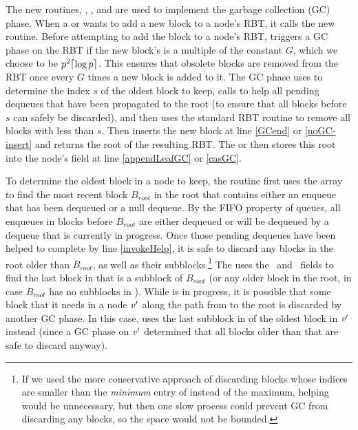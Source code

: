 The new routines, , ,  and  are
used to implement the garbage collection (GC) phase.
When a  or  wants to add a new block to a node's  RBT,
it calls the new  routine.
Before attempting to add the block to a node's RBT,  triggers a GC phase on the RBT if 
the new block's  is a multiple of the constant $G$, which we choose to be $p^2\lceil \log p \rceil$.
This ensures that obsolete blocks are removed from the RBT once every $G$ times a new block is added to it.
The GC phase uses  to determine the index $s$ of the oldest block to keep,
calls  to help all pending dequeues that have been propagated to the root
(to ensure that all blocks before $s$ can safely be discarded), and then
uses the standard RBT  routine \cite{Tar83}
to remove all blocks with  less than $s$.
Then 
inserts the new block at line \ref{GCend} or \ref{noGC-insert}
and returns the root of the resulting RBT.
The  or  then stores this root into the node's  field at line 
 \ref{appendLeafGC} or \ref{casGC}.

To determine the oldest block in a node  to keep, the  routine  first
uses the  array to
find the most recent block $B_{root}$ in the root that contains either an enqueue that has been dequeued
or a null dequeue.  By the FIFO property of queues, all enqueues in blocks before $B_{root}$ are either
dequeued or will be dequeued by a dequeue that is currently in progress.  Once those pending dequeues have been
helped to complete by line \ref{invokeHelp},
it is safe to discard any blocks in the root older than $B_{root}$, as well
as their subblocks.\footnote{If we used the more conservative approach of discarding blocks whose indices 
are smaller than the \emph{minimum} entry of  instead of the maximum, helping would be unnecessary, but then one slow process could prevent GC from discarding any blocks, so the space would not be bounded.}
The  uses the \eleft\ and \eright\ fields to find the last block in  that is a subblock
of $B_{root}$ (or any older block in the root, in case $B_{root}$ has no subblocks in ).
While  is in progress, it is possible that some block that it needs in a node $\mbox{\textnormal{\textit{v}}}'$
along the path from  to the root is discarded by another GC phase.
In this case,  uses the last subblock in  of the oldest block in $\mbox{\textnormal{\textit{v}}}'$ instead
(since a GC phase on $\mbox{\textnormal{\textit{v}}}'$ determined that all blocks older than that are safe to discard anyway).

